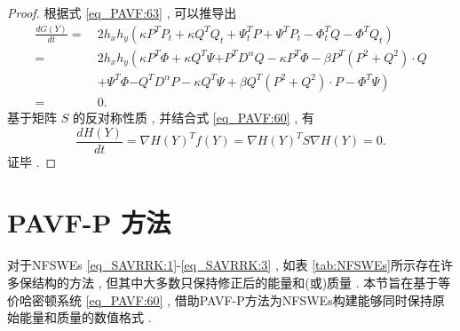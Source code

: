 \begin{proof}
	根据式 \eqref{eq_PAVF:63} , 可以推导出
	\begin{align}\label{eq_PAVF:64}
		\frac{d G(Y)}{d t}=&~2 h_{x} h_{y}\left(\kappa P^{T}P_t+\kappa Q^{T}Q_t+\Psi^{T}_t P+\Psi^{T}P_{t}-\varPhi^{T}_t Q-\varPhi^{T}Q_{t}\right)\nonumber\\
		=&~2 h_{x} h_{y}\left(\kappa P^{T}\varPhi+\kappa Q^{T}\Psi {+ P^{T}D^{\alpha}Q}-\kappa P^{T}\varPhi-\beta P^{T}\left( P^{2}+Q^{2}\right)\cdot Q\right . \nonumber\\
		&~\left . +\Psi^{T}\varPhi{-Q^{T}D^{\alpha}P}-\kappa Q^{T}\Psi+\beta Q^{T}\left( P^{2}+Q^{2}\right)\cdot P-\varPhi^{T}\Psi\right)\nonumber\\
		=&~0 . 
		\end{align}
		基于矩阵 $S$ 的反对称性质 , 并结合式 \eqref{eq_PAVF:60} , 有
		\begin{equation}\label{eq_PAVF:65}
		\frac{d H(Y)}{d t}=\nabla H(Y)^{T} f(Y)=\nabla H(Y)^{T} S \nabla H(Y)=0  . 
		\end{equation}
		证毕 . 
		\end{proof}

\section{PAVF-P 方法}\label{Section_PAVF: 3}
对于NFSWEs \eqref{eq_SAVRRK:1}-\eqref{eq_SAVRRK:3} , 如表 \ref{tab:NFSWEs}所示存在许多保结构的方法 , 但其中大多数只保持修正后的能量和(或)质量 . 
本节旨在基于等价哈密顿系统 \eqref{eq_PAVF:60} , 借助PAVF-P方法\cite{caiPartitionedAveragedVector2018}为NFSWEs构建能够同时保持原始能量和质量的数值格式 . 

